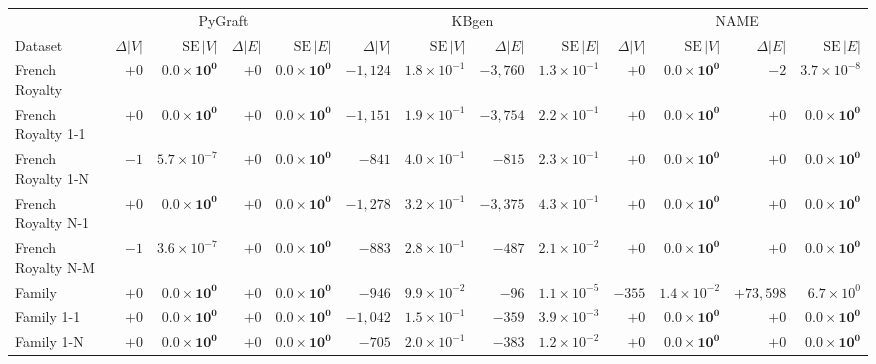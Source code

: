 \begin{tabular}{lrrrr|rrrr|rrrr}
\toprule
 & \multicolumn{4}{c|}{PyGraft} & \multicolumn{4}{c|}{KBgen} & \multicolumn{4}{c}{NAME} \\
Dataset & $\Delta|V|$ & $\mathrm{SE}\,|V|$ & $\Delta|E|$ & $\mathrm{SE}\,|E|$ & $\Delta|V|$ & $\mathrm{SE}\,|V|$ & $\Delta|E|$ & $\mathrm{SE}\,|E|$ & $\Delta|V|$ & $\mathrm{SE}\,|V|$ & $\Delta|E|$ & $\mathrm{SE}\,|E|$ \\
\midrule
French Royalty & $+0$ & $\mathbf{0.0\times10^{0}}$ & $+0$ & $\mathbf{0.0\times10^{0}}$ & $-1{,}124$ & $1.8\times10^{-1}$ & $-3{,}760$ & $1.3\times10^{-1}$ & $+0$ & $\mathbf{0.0\times10^{0}}$ & $-2$ & $3.7\times10^{-8}$ \\
French Royalty 1-1 & $+0$ & $\mathbf{0.0\times10^{0}}$ & $+0$ & $\mathbf{0.0\times10^{0}}$ & $-1{,}151$ & $1.9\times10^{-1}$ & $-3{,}754$ & $2.2\times10^{-1}$ & $+0$ & $\mathbf{0.0\times10^{0}}$ & $+0$ & $\mathbf{0.0\times10^{0}}$ \\
French Royalty 1-N & $-1$ & $5.7\times10^{-7}$ & $+0$ & $\mathbf{0.0\times10^{0}}$ & $-841$ & $4.0\times10^{-1}$ & $-815$ & $2.3\times10^{-1}$ & $+0$ & $\mathbf{0.0\times10^{0}}$ & $+0$ & $\mathbf{0.0\times10^{0}}$ \\
French Royalty N-1 & $+0$ & $\mathbf{0.0\times10^{0}}$ & $+0$ & $\mathbf{0.0\times10^{0}}$ & $-1{,}278$ & $3.2\times10^{-1}$ & $-3{,}375$ & $4.3\times10^{-1}$ & $+0$ & $\mathbf{0.0\times10^{0}}$ & $+0$ & $\mathbf{0.0\times10^{0}}$ \\
French Royalty N-M & $-1$ & $3.6\times10^{-7}$ & $+0$ & $\mathbf{0.0\times10^{0}}$ & $-883$ & $2.8\times10^{-1}$ & $-487$ & $2.1\times10^{-2}$ & $+0$ & $\mathbf{0.0\times10^{0}}$ & $+0$ & $\mathbf{0.0\times10^{0}}$ \\
\midrule
Family & $+0$ & $\mathbf{0.0\times10^{0}}$ & $+0$ & $\mathbf{0.0\times10^{0}}$ & $-946$ & $9.9\times10^{-2}$ & $-96$ & $1.1\times10^{-5}$ & $-355$ & $1.4\times10^{-2}$ & $+73{,}598$ & $6.7\times10^{0}$ \\
Family 1-1 & $+0$ & $\mathbf{0.0\times10^{0}}$ & $+0$ & $\mathbf{0.0\times10^{0}}$ & $-1{,}042$ & $1.5\times10^{-1}$ & $-359$ & $3.9\times10^{-3}$ & $+0$ & $\mathbf{0.0\times10^{0}}$ & $+0$ & $\mathbf{0.0\times10^{0}}$ \\
Family 1-N & $+0$ & $\mathbf{0.0\times10^{0}}$ & $+0$ & $\mathbf{0.0\times10^{0}}$ & $-705$ & $2.0\times10^{-1}$ & $-383$ & $1.2\times10^{-2}$ & $+0$ & $\mathbf{0.0\times10^{0}}$ & $+0$ & $\mathbf{0.0\times10^{0}}$ \\

\end{tabular}
